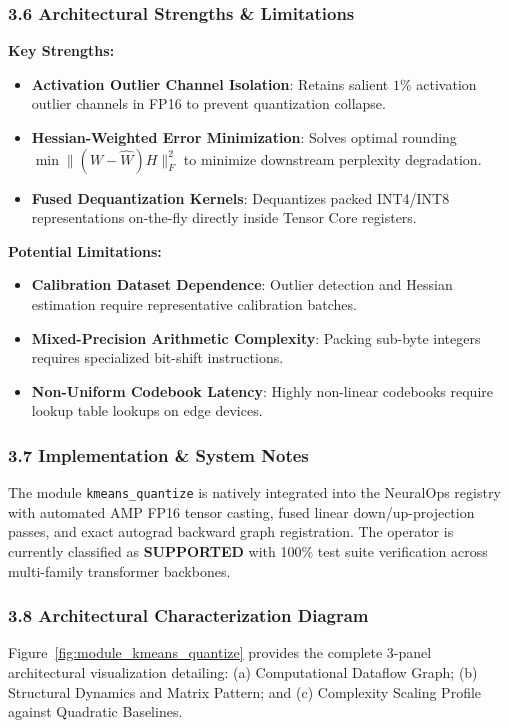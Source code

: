 \subsubsection*{3.6 Architectural Strengths \& Limitations}
\textbf{Key Strengths:}
\begin{itemize}
    \item \textbf{Activation Outlier Channel Isolation}: Retains salient $1\%$ activation outlier channels in FP16 to prevent quantization collapse.
    \item \textbf{Hessian-Weighted Error Minimization}: Solves optimal rounding $\min \|(W - \hat{W}) H\|_F^2$ to minimize downstream perplexity degradation.
    \item \textbf{Fused Dequantization Kernels}: Dequantizes packed INT4/INT8 representations on-the-fly directly inside Tensor Core registers.
\end{itemize}

\textbf{Potential Limitations:}
\begin{itemize}
    \item \textbf{Calibration Dataset Dependence}: Outlier detection and Hessian estimation require representative calibration batches.
    \item \textbf{Mixed-Precision Arithmetic Complexity}: Packing sub-byte integers requires specialized bit-shift instructions.
    \item \textbf{Non-Uniform Codebook Latency}: Highly non-linear codebooks require lookup table lookups on edge devices.
\end{itemize}

\subsubsection*{3.7 Implementation \& System Notes}
The module \texttt{kmeans\_quantize} is natively integrated into the NeuralOps registry with automated AMP FP16 tensor casting, fused linear down/up-projection passes, and exact autograd backward graph registration. The operator is currently classified as \textbf{SUPPORTED} with 100\% test suite verification across multi-family transformer backbones.

\subsubsection*{3.8 Architectural Characterization Diagram}
Figure~\ref{fig:module_kmeans_quantize} provides the complete 3-panel architectural visualization detailing: (a) Computational Dataflow Graph; (b) Structural Dynamics and Matrix Pattern; and (c) Complexity Scaling Profile against Quadratic Baselines.


